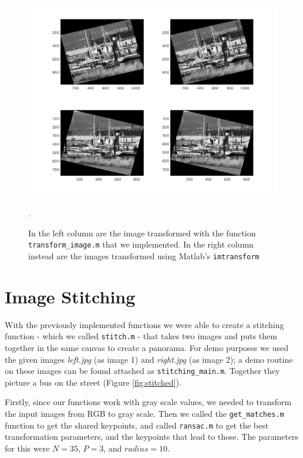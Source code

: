 \documentclass[11pt]{article}
\begin{document}
\begin{figure}[htpb]
	\centering
	\includegraphics[width=1\textwidth]{imgs/imtransform_vs_custom.jpg}
	\caption{In the left column are the image transformed with the function
		\texttt{transform\_image.m} that we implemented. In the right
		column instead are the images transformed using Matlab's
		\texttt{imtransform}}.
	\label{fig:imtransform_vs_custom}
\end{figure}



\section{Image Stitching}
With the previously implemented functions we were able to create a stitching
function - which we called \texttt{stitch.m} - that takes two images and puts
them together in the same canvas to create a panorama. For demo purposes we used
the given images \textit{left.jpg} (as image 1) and \textit{right.jpg} (as image
2); a demo routine on these images can be found attached as
\texttt{stitching\_main.m}. Together they picture a bus on the street (Figure
\ref{fig:stitched}).

Firstly, since our functions work with gray scale values, we needed to transform
the input images from RGB to gray scale. Then we called the
\texttt{get\_matches.m} function to get the shared keypoints, and called
\texttt{ransac.m} to get the best transformation parameters, and the keypoints
that lead to those. The parameters for this were $N = 35$, $P = 3$, and $radius
= 10$.
\end{document}
